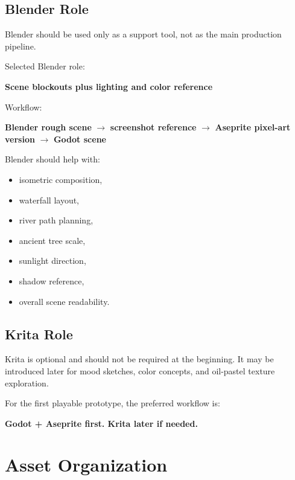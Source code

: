 \documentclass[12pt]{article}
\begin{document}
\subsection{Blender Role}

Blender should be used only as a support tool, not as the main production pipeline.

Selected Blender role:

\begin{center}
\textbf{Scene blockouts plus lighting and color reference}
\end{center}

Workflow:

\begin{center}
\textbf{Blender rough scene} $\rightarrow$
\textbf{screenshot reference} $\rightarrow$
\textbf{Aseprite pixel-art version} $\rightarrow$
\textbf{Godot scene}
\end{center}

Blender should help with:

\begin{itemize}[leftmargin=*]
    \item isometric composition,
    \item waterfall layout,
    \item river path planning,
    \item ancient tree scale,
    \item sunlight direction,
    \item shadow reference,
    \item overall scene readability.
\end{itemize}

\subsection{Krita Role}

Krita is optional and should not be required at the beginning. It may be introduced later for mood sketches, color concepts, and oil-pastel texture exploration.

For the first playable prototype, the preferred workflow is:

\begin{center}
\textbf{Godot + Aseprite first. Krita later if needed.}
\end{center}

\section{Asset Organization}
\end{document}
